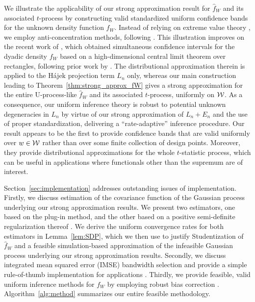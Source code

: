 We illustrate the applicability of our strong approximation result for
$\widehat{f}_W$ and its associated $t$-process by constructing valid
standardized uniform confidence bands for
the unknown density function $f_W$.
Instead of relying on extreme value theory \citep*[e.g.][]{gine2004kernel}, we
employ anti-concentration methods, following \citet{chernozhukov2014anti}.
This illustration improves on the recent work of \citet{chiang2022inference},
which obtained simultaneous confidence intervals for the dyadic density $f_W$
based on a high-dimensional central limit theorem over rectangles,
following prior work by \cite{Chernozhukov-Chetverikov-Kato_2017_AoP}.
The distributional
approximation therein is applied to the
H\'{a}jek projection term $L_n$ only, whereas
our main construction leading to Theorem~\ref{thm:strong_approx_fW} gives a
strong approximation for the entire U-process-like
$\widehat{f}_W$ and its associated $t$-process, uniformly on $\mathcal{W}$.
As a consequence, our uniform inference theory is robust to potential
unknown degeneracies in $L_n$ by virtue of our strong
approximation of $L_n+E_n$ and the use of proper standardization,
delivering a ``rate-adaptive'' inference procedure.
Our result appears to be the first to provide
confidence bands that are valid uniformly
over $w \in \mathcal{W}$ rather than over some finite collection of design points.
Moreover, they provide distributional approximations for
the whole $t$-statistic process,
which can be useful in applications where functionals other
than the supremum are of interest.

Section~\ref{sec:implementation} addresses outstanding issues of
implementation. Firstly, we discuss estimation of the covariance function of the
Gaussian process underlying our strong approximation results. We present two
estimators, one based on the plug-in method, and the other based on a
positive semi-definite regularization thereof
\citep{laurent2005semidefinite}. We derive the uniform convergence rates for
both estimators in Lemma~\ref{lem:SDP}, which we then use to justify
Studentization of $\widehat{f}_W$ and a
feasible simulation-based approximation of the infeasible Gaussian process
underlying our strong approximation results.
Secondly, we discuss integrated mean
squared error (IMSE) bandwidth selection and provide a simple rule-of-thumb
implementation for applications \citep{wand1994kernel,simonoff2012smoothing}.
Thirdly, we provide
feasible, valid uniform inference methods for
$f_W$ by employing robust bias correction
\citep{Calonico-Cattaneo-Farrell_2018_JASA,
  Calonico-Cattaneo-Farrell_2022_Bernoulli}.
Algorithm~\ref{alg:method} summarizes our entire feasible methodology.

